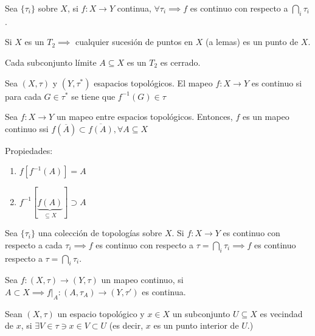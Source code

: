 \begin{teorema}
    Sea $\{\tau_i\}$ sobre $X$, si $f:X\to Y$ continua, $\forall \tau_i\implies f$ es continuo con respecto a $\bigcap_i\tau_i$.
\end{teorema}

\begin{teorema}
    Si $X$ es un $T_2\implies $ cualquier sucesión de puntos en $X$ (a lemas) es un punto de $X$.
\end{teorema}

\begin{teorema}
    Cada subconjunto límite $A\subseteq X$ es un $T_2$ es cerrado. 
\end{teorema}


\begin{definicion}
    Sea $(X,\tau)$ y $(Y,\tau^*)$ esapacios topológicos. El mapeo $f:X\to Y$ es continuo si para cada $G\in \tau^*$ se tiene que $f^{-1}(G)\in\tau$
\end{definicion}


\begin{prop}
    Sea $f:X\to Y$ un mapeo entre espacios topológicos. Entonces, $f$ es un mapeo continuo ssi $f(\overline{A})\subset \overline{f(A)},\forall A\subseteq X$
    \begin{cajita}
        Propiedades: 
        \begin{enumerate}
            \item $f[f^{-1}(A)]=A$
            \item $f^{-1}[\underbrace{f(A)}_{\subseteq X}]\supset A$
        \end{enumerate}
    \end{cajita}
\end{prop}

\begin{prop}
    Sea $\{\tau_i\}$ una colección de topologías sobre $X$. Si $f:X\to Y$ es continuo con respecto a cada $\tau_i\implies f$ es continuo con respecto a $\tau=\bigcap_i\tau_i\implies f$ es continuo respecto a $\tau=\bigcap_i \tau_i$.
\end{prop}

\begin{prop}
    Sea $f:(X,\tau)\to (Y,\tau)$ un mapeo continuo, si $A\subset X\implies f|_A:(A,\tau_A)\to (Y,\tau')$ es continua. 
\end{prop} 


\begin{definicion}
    Sean $(X,\tau)$ un espacio topológico y $x\in X$ un subconjunto $U\subseteq X$ es vecindad de $x$, si $\exists V\in \tau\ni x\in V\subset U$ (es decir, $x$ es un punto interior de $U$.)
\end{definicion}

